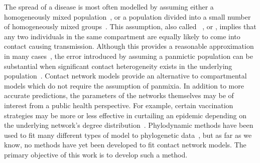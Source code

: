 
The spread of a disease is most often modelled by assuming either a
homogeneously mixed population~\autocite{hamer1906milroy,
kermack1927contribution}, or a population divided into a small number of
homogeneously mixed groups~\autocite{rushton1955deterministic}. This
assumption, also called ~\autocite{heesterbeek2000mathematical}, or , implies
that any two individuals in the same compartment are equally likely to come
into contact causing transmission. Although this provides a reasonable
approximation in many cases~\autocite{anderson1992infectious}, the error
introduced by assuming a panmictic population can be substantial when
significant contact heterogeneity exists in the underlying
population~\autocite{bansal2007individual,barthelemy2005dynamical,keeling2005networks}.
Contact network models provide an alternative to compartmental models which do
not require the assumption of panmixia. In addition to more accurate
predictions, the parameters of the networks themselves may be of interest from
a public health perspective. For example, certain vaccination strategies may be
more or less effective in curtailing an epidemic depending on the underlying
network's degree distribution~\autocite{peng2013vaccination, ma2013importance}.
Phylodynamic methods have been used to fit many different types of model to
phylogenetic data~\autocite{pybus2009evolutionary,volz2013viral}, but as far as
we know, no methods have yet been developed to fit contact network models. The
primary objective of this work is to develop such a method.

\newcommand{\G}{\mathcal{G}}
\newcommand{\Nu}{\mathcal{N}}

